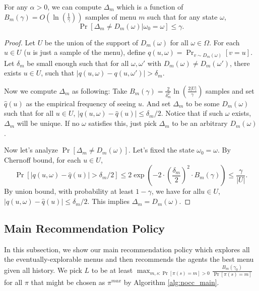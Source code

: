 \begin{lemma}
\label{lem:deltam}
For any $\alpha > 0$, we can compute $\Delta_m$ which is a function of $B_m(\gamma) = O\left(\ln\left(\frac{1}{\gamma}\right)\right)$ samples of menu $m$ such that for any state $\omega$,
\[
\Pr[\Delta_m \neq D_m(\omega) | \omega_0 = \omega] \leq \gamma.
\]
\end{lemma}

\begin{proof}
Let $U$ be the union of the support of $D_m(\omega)$ for all $\omega \in \varOmega$. For each $u \in U$ ($u$ is just a sample of the menu), define $q(u,\omega) = \Pr_{v \sim D_m(\omega)}[v = u]$. Let $\delta_m$ be small enough such that for all $\omega, \omega'$ with $D_m(\omega) \neq D_m(\omega')$, there exists $u \in U$, such that $|q(u,\omega) - q(u,\omega')| > \delta_m$.

Now we compute $\Delta_m$ as following: Take $B_m(\gamma) = \frac{2}{\delta_m^2}\ln\left(\frac{2|U|}{\gamma}\right) $ samples and set $\hat{q}(u)$ as the empirical frequency of seeing $u$. And set $\Delta_m$ to be some $D_m(\omega)$ such that for all $u \in U$, $|q(u,\omega) - \hat{q}(u)| \leq \delta_m / 2$. Notice that if such $\omega$ exists, $\Delta_m$ will be unique. If no $\omega$ satisfies this, just pick $\Delta_m$ to be an arbitrary $D_m(\omega)$.

Now let's analyze $\Pr[\Delta_m \neq D_m(\omega)]$. Let's fixed the state $\omega_0 = \omega$. By Chernoff bound, for each $u \in U$,
\[
\Pr[|q(u,\omega) -\hat{q}(u)| > \delta_m/2] \leq 2\exp\left(-2 \cdot \left(\frac{\delta_m}{2}\right)^2 \cdot B_m(\gamma)\right) \leq \frac{\gamma}{|U|}.
\]
By union bound, with probability at least $1-\gamma$, we have for all$u \in U$, $|q(u,\omega) - \hat{q}(u)| \leq \delta_m / 2$. This implies $\Delta_m = D_m(\omega)$.
\end{proof}

\subsection{Main Recommendation Policy}
\label{sec:private_main}
In this subsection, we show our main recommendation policy which explores all the eventually-explorable menus and then recommends the agents the best menu given all history. We pick $L$ to be at least $\max_{m,s:\Pr[\pi(s)=m] >0} \frac{B_m(\gamma_0)}{ \Pr[\pi(s)=m]}$ for all $\pi$ that might be chosen as $\pi^{max}$ by Algorithm \ref{alg:nocc_main}.


